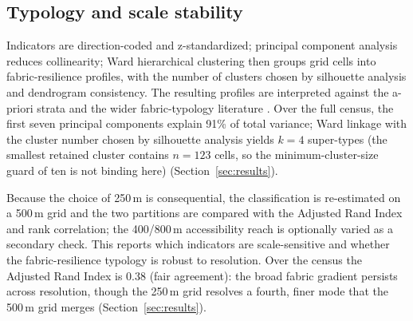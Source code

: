 \subsection{Typology and scale stability}
\label{sec:methods-cluster}
Indicators are direction-coded and z-standardized; principal component analysis
reduces collinearity; Ward hierarchical clustering then groups grid cells into
fabric-resilience profiles, with the number of clusters chosen by silhouette
analysis and dendrogram consistency. The resulting profiles are interpreted
against the a-priori strata and the wider fabric-typology literature
\citep{bobkova2021TowardsAnalytic, yu2023UrbanNeighbou, araldi2025MultiLevel,
debray2025UniversalPatterns, vartholomaios2025Detection}. Over the full census, the first
seven principal components explain 91\% of total variance; Ward linkage with the
cluster number chosen by silhouette analysis yields $k=4$ super-types (the
smallest retained cluster contains $n=123$ cells, so the minimum-cluster-size
guard of ten is not binding here) (Section~\ref{sec:results}).

\label{sec:methods-scale}
Because the choice of 250\,m is consequential, the classification is re-estimated
on a 500\,m grid and the two partitions are compared with the Adjusted Rand Index
and rank correlation; the 400/800\,m accessibility reach is optionally varied as a
secondary check. This reports which indicators are scale-sensitive and whether the
fabric-resilience typology is robust to resolution. Over the census the Adjusted
Rand Index is 0.38 (fair agreement): the broad fabric gradient persists across
resolution, though the 250\,m grid resolves a fourth, finer mode that the 500\,m grid
merges (Section~\ref{sec:results}).

